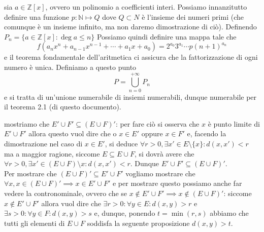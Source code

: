 \documentclass{report}
\begin{document}
\begin{myproof}
	sia $a \in \mathbb{Z}[x]$, ovvero un polinomio a coefficienti interi. Possiamo innanzitutto definire una funzione $p: \mathbb{N} \mapsto Q$ dove $Q \subset N$ è l'insieme dei numeri primi (che comunque è un insieme infinito, ma non daremo dimostrazione di ciò). Definendo $P_n = \{a \in \mathbb{Z}[x]: \deg{a} \leq n \}$ Possiamo quindi definire una mappa tale che
	$$
	f(a_n x^n + a_{n-1}x^{n-1} + \cdots + a_1 x + a_0) = 2^{a_0}3^{a_1} \cdots p(n+1)^{a_n}
	$$
e il teorema fondamentale dell'aritmetica ci assicura che la fattorizzazione di ogni numero è unica. Definiamo a questo punto
$$
	P = \bigcup_{n=0}^{+\infty} P_n
$$
e si tratta di un'unione numerabile di insiemi numerabili, dunque numerabile per il teorema 2.1 (di questo documento). 
\end{myproof}
\begin{myproof}
mostriamo che $E' \cup F' \subseteq (E \cup F)'$: per fare ciò si osserva che $x$ è punto limite di $E' \cup F'$ allora questo vuol dire che o $x \in E'$ oppure $x \in F'$ e, facendo la dimostrazione nel caso di $x \in E'$, si deduce $\forall r > 0, \exists x' \in E \setminus \{x \} : d(x, x') < r$ ma a maggior ragione, siccome $E \subseteq E \cup F$, si dovrà avere che $\forall r > 0, \exists x' \in (E \cup F) \setminus x: d(x, x') < r$. Dunque $E' \cup F' \subseteq (E \cup F)'$. \\
Per mostrare che $(E \cup F)' \subseteq E' \cup F'$ vogliamo mostrare che $\forall x, x \in (E \cup F)' \implies x \in E' \cup F'$ e per mostrare questo possiamo anche far vedere la contronominale, ovvero che se $x \not\in E' \cup F' \implies x \not\in (E \cup F)'$: siccome $x \not\in E' \cup F'$ allora vuol dire che $\exists r>0: \forall y \in E: d(x, y) > r$ e $\exists  s >0: \forall y \in F: d(x, y) > s$ e, dunque, ponendo $t = \min{(r,s )}$ abbiamo che tutti gli elementi di $E \cup F$ soddisfa la seguente proposizione $d(x, y) > t$.
\end{myproof}
\end{document}
